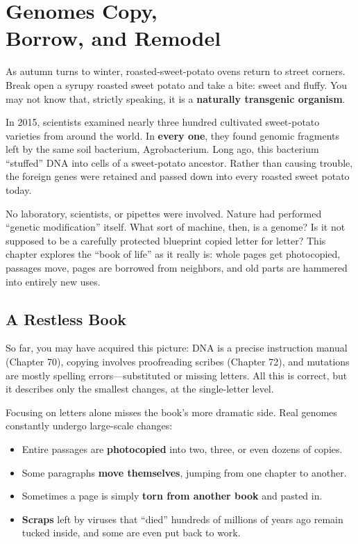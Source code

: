 \chapter[Genomes Copy, Borrow, and Remodel]{Genomes Copy,\protect\\ Borrow, and Remodel}

\begin{kaichang}
As autumn turns to winter, roasted-sweet-potato ovens return to street corners. Break open a syrupy roasted sweet potato and take a bite: sweet and fluffy. You may not know that, strictly speaking, it is a \textbf{naturally transgenic organism}.

In 2015, scientists examined nearly three hundred cultivated sweet-potato varieties from around the world. In \textbf{every one}, they found genomic fragments left by the same soil bacterium, Agrobacterium. Long ago, this bacterium ``stuffed'' DNA into cells of a sweet-potato ancestor. Rather than causing trouble, the foreign genes were retained and passed down into every roasted sweet potato today.

No laboratory, scientists, or pipettes were involved. Nature had performed ``genetic modification'' itself. What sort of machine, then, is a genome? Is it not supposed to be a carefully protected blueprint copied letter for letter? This chapter explores the ``book of life'' as it really is: whole pages get photocopied, passages move, pages are borrowed from neighbors, and old parts are hammered into entirely new uses.
\end{kaichang}

\section{A Restless Book}

So far, you may have acquired this picture: DNA is a precise instruction manual (Chapter 70), copying involves proofreading scribes (Chapter 72), and mutations are mostly spelling errors---substituted or missing letters. All this is correct, but it describes only the smallest changes, at the single-letter level.

Focusing on letters alone misses the book's more dramatic side. Real genomes constantly undergo large-scale changes:

\begin{itemize}[itemsep=2pt]
\item Entire passages are \textbf{photocopied} into two, three, or even dozens of copies.
\item Some paragraphs \textbf{move themselves}, jumping from one chapter to another.
\item Sometimes a page is simply \textbf{torn from another book} and pasted in.
\item \textbf{Scraps} left by viruses that ``died'' hundreds of millions of years ago remain tucked inside, and some are even put back to work.
\end{itemize}

